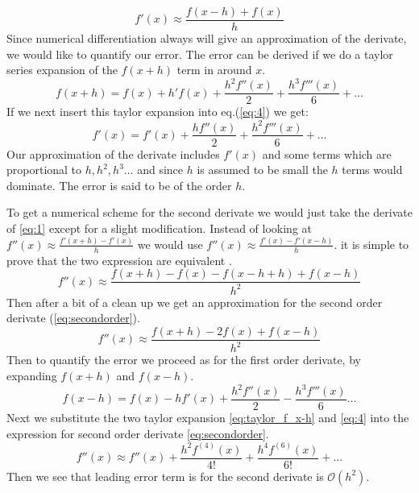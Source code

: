 \begin{equation}\label{eq:5}
  f'(x) \approx \frac{f(x-h)+f(x)}{h}
\end{equation}
Since numerical differentiation always will give an approximation of the
derivate, we would like to quantify our error. The error can be derived 
if we do a taylor series expansion of the $f(x+h)$ term in around $x$.
\begin{equation}\label{eq:4}
    f(x+h) = f(x) + h'f(x) + \frac{h^2f''(x)}{2} + \frac{h^3f'''(x)}{6} + \dots    
\end{equation}   
If we next insert this taylor expansion into eq.(\ref{eq:4}) we get:
\begin{equation}
  f'(x) = f'(x) + \frac{h f''(x)}{2} + \frac{h^2f'''(x)}{6} + \dots
\end{equation} 
Our approximation of the derivate includes $f'(x)$ and some terms which are
proportional to $h, h^2, h^3 \dots $ and since $h$ is assumed to be small the
$h$ terms would dominate. The error is said to be of the order $h$. 
\par
To get a numerical scheme for the second derivate we would just take the
derivate of \cref{eq:1} except for a slight modification. Instead of looking at $f''(x) \approx \frac{f'(x+h)-f'(x)}{h}$ we would use 
$f''(x) \approx\frac{f'(x)-f'(x-h)}{h}$. it is simple to prove that the two
expression are equivalent \cite{mathexh}. 
\begin{equation}
  f''(x) \approx \frac{f(x + h) - f(x) -f(x-h+h) +f(x-h)}{h^2}
\end{equation}
Then after a bit of a clean up we get an approximation for the second order
derivate (\cref{eq:secondorder}). 
\begin{equation}\label{eq:secondorder}
  f''(x) \approx \frac{f(x+h)-2f(x) + f(x-h)}{h^2}
\end{equation}
Then to quantify the error we proceed as for the first order derivate, by
expanding $f(x+h)$ and $f(x-h)$. 
\begin{equation}\label{eq:taylor_f_x-h}
  f(x-h) = f(x)- h f'(x) + \frac{h^2 f''(x)}{2} - \frac{h^3f'''(x)}{6} \dots 
\end{equation} 
Next we substitute the two taylor expansion \cref{eq:taylor_f_x-h} and 
\cref{eq:4} into the expression for second order derivate \cref{eq:secondorder}.
\begin{equation}
  f''(x) \approx f''(x) + \frac{h^2f^{(4)}(x)}{4!} + \frac{h^4 f^{(6)}(x)}{6!} + \dots
\end{equation}
Then we see that leading error term is for the second derivate is 
$\mathcal{O}(h^2)$.   
